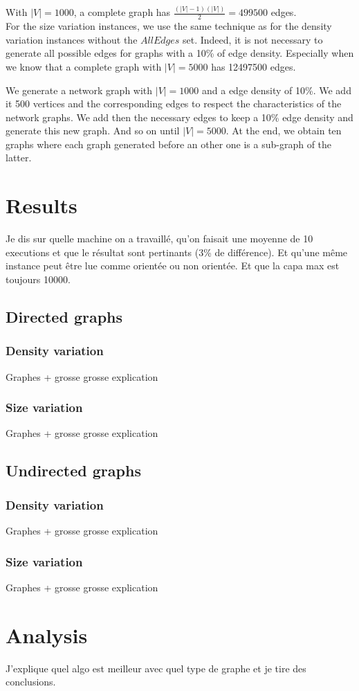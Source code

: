 With $|V|=1000$, a complete graph has $\frac{(|V|-1)(|V|)}{2} = 499500$ edges.\\

For the size variation instances, we use the same technique as for the density variation instances without the $AllEdges$ set. Indeed, it is not necessary to generate all possible edges for graphs with a 10\% of edge density. Especially when we know that a complete graph with $|V|=5000$ has 12497500 edges.

We generate a network graph with $|V|=1000$ and a edge density of 10\%. We add it 500 vertices and the corresponding edges to respect the characteristics of the network graphs. We add then the necessary edges to keep a 10\% edge density and generate this new graph. And so on until $|V|=5000$. At the end, we obtain ten graphs where each graph generated before an other one is a sub-graph of the latter.

\section{Results}
Je dis sur quelle machine on a travaillé, qu'on faisait une moyenne de 10 executions et que le résultat sont pertinants (3\% de différence). Et qu'une même instance peut être lue comme orientée ou non orientée. Et que la capa max est toujours 10000.
\subsection{Directed graphs}
\subsubsection{Density variation}
Graphes + grosse grosse explication
\subsubsection{Size variation}
Graphes + grosse grosse explication
\subsection{Undirected graphs}
\subsubsection{Density variation}
Graphes + grosse grosse explication
\subsubsection{Size variation}
Graphes + grosse grosse explication
\section{Analysis}
J'explique quel algo est meilleur avec quel type de graphe et je tire des conclusions.